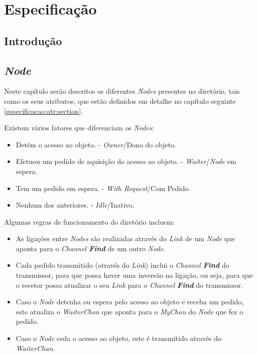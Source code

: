\chapter{Especificação}
\label{chap:especificacao}

\section{Introdução}
\label{especificacao:sec:intro}
\section{\emph{Node}}
Neste capítulo serão descritos os diferentes \emph{Nodes} presentes no diretório, tais como os seus atributos, 
que estão definidos em detalhe no capítulo seguinte \ref{especificacao:atr:section}.

Existem vários fatores que diferenciam os \emph{Nodes}: 
\begin{itemize}
    \item Detém o acesso ao objeto. - \emph{Owner}/Dono do objeto.
    \item Efetuou um pedido de aquisição do acesso ao objeto. - \emph{Waiter}/\emph{Node} em espera.
    \item Tem um pedido em espera. - \emph{With Request}/Com Pedido.
    \item Nenhum dos anteriores. - \emph{Idle}/Inativo.
\end{itemize}



Algumas regras de funcionamento do diretório incluem:

\begin{itemize}
    \item As ligações entre \emph{Nodes} são realizadas através do \emph{Link} de um \emph{Node}
    que aponta para o \emph{Channel \textbf{Find}} de um outro \emph{Node}.
    \item Cada pedido transmitido (através do \emph{Link}) inclui o \emph{Channel \textbf{Find}} do transmissor,   
    para que possa haver uma inversão na ligação, ou seja, para que o recetor possa atualizar 
    o seu \emph{Link} para o \emph{Channel \textbf{Find}} do transmissor.
    \item Caso o \emph{Node} detenha ou espera pelo acesso ao objeto e receba um pedido,
    este atualiza o \emph{WaiterChan} que aponta para o \emph{MyChan} do \emph{Node} que fez o pedido.
    \item Caso o \emph{Node} ceda o acesso ao objeto, este é transmitido através do \emph{WaiterChan}.
\end{itemize}


